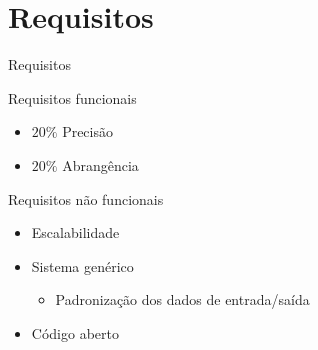 \section[Requisitos]{Requisitos}
\begin{frame}{Requisitos}
\begin{block}{Requisitos funcionais}
\begin{itemize}
	\item $20\%$ Precisão
	\item $20\%$ Abrangência
\end{itemize}
\end{block}

\begin{block}{Requisitos não funcionais}
\begin{itemize}
	\item Escalabilidade
	\item Sistema genérico
	\begin{itemize}
		\item Padronização dos dados de entrada/saída
	\end{itemize}
	\item Código aberto
\end{itemize}
\end{block}
\end{frame}

